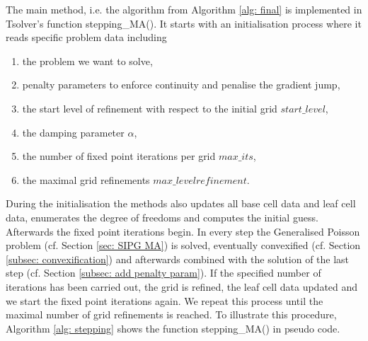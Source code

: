 The main method, i.e. the algorithm from Algorithm \ref{alg: final} is implemented in Tsolver's function stepping\_MA(). It starts with an initialisation process where it reads specific problem data including
\begin{enumerate}
 \item the problem we want to solve,
 \item penalty parameters to enforce continuity and penalise the gradient jump,
 \item the start level of refinement with respect to the initial grid $start\_level$,
 \item the damping parameter $\alpha$,
 \item the number of fixed point iterations per grid $max\_its$,
 \item the maximal grid refinements $max\_levelrefinement$.
\end{enumerate}
During the initialisation the methods also updates all base cell data and leaf cell data, enumerates the degree of freedoms and computes the initial guess.\\
Afterwards the fixed point iterations begin. In every step the Generalised Poisson problem (cf. Section \ref{sec: SIPG MA}) is solved, eventually convexified (cf. Section \ref{subsec: convexification}) and afterwards combined with the solution of the last step (cf. Section \ref{subsec: add penalty param}). If the specified number of iterations has been carried out, the grid is refined, the leaf cell data updated and we start the fixed point iterations again.
We repeat this process until the maximal number of grid refinements is reached.
To illustrate this procedure, Algorithm \ref{alg: stepping} shows the function stepping\_MA() in pseudo code.
